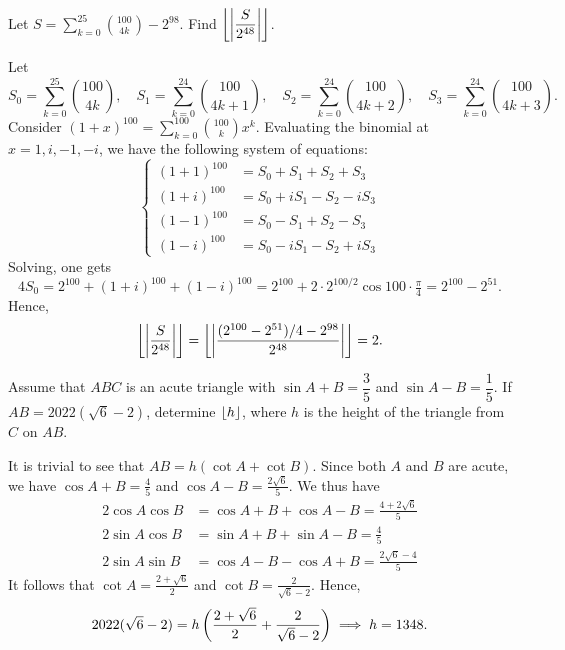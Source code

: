 \begin{question}[2]\label{A::2021-O-1-14}
    Let $S = \displaystyle\sum_{k=0}^{25} \binom{100}{4k} - 2^{98}$. Find $\left\lfloor \left\lvert \dfrac{S}{2^{48}} \right\rvert \right\rfloor$.
\end{question}
\begin{solution*}
    Let \[S_0 = \sum_{k=0}^{25} \binom{100}{4k}, \quad S_1 = \sum_{k=0}^{24} \binom{100}{4k+1}, \quad S_2 = \sum_{k=0}^{24} \binom{100}{4k+2}, \quad S_3 = \sum_{k=0}^{24} \binom{100}{4k+3}.\] Consider $(1 + x)^{100} = \displaystyle\sum_{k=0}^{100} \binom{100}{k} x^{k}$. Evaluating the binomial at $x = 1, i, -1, -i$, we have the following system of equations: \[\left\{
        \begin{aligned}
            (1+1)^{100} &= S_0 + S_1 + S_2 + S_3\\
            (1+i)^{100} &= S_0 + iS_1 - S_2 - iS_3\\
            (1-1)^{100} &= S_0 - S_1 + S_2 - S_3\\
            (1-i)^{100} &= S_0 - iS_1 - S_2 + iS_3
        \end{aligned}\right.\] Solving, one gets \[4S_0 = 2^{100} + (1+i)^{100} + (1-i)^{100} = 2^{100} + 2 \cdot 2^{100/2}\cos{100 \cdot \tfrac{\pi}4} = 2^{100} - 2^{51}.\] Hence, \[\left\lfloor \left\lvert \frac{S}{2^{48}} \right\rvert \right\rfloor = \left\lfloor \left\lvert \frac{(2^{100} - 2^{51})/4 - 2^{98}}{2^{48}} \right\rvert \right\rfloor = 2.\]
\end{solution*}

\begin{question}[1348]\label{A::2021-O-1-15}
    Assume that $ABC$ is an acute triangle with $\sin{A + B} = \dfrac35$ and $\sin{A-B} = \dfrac15$. If $AB = 2022(\sqrt6 - 2)$, determine $\left\lfloor h \right\rfloor$, where $h$ is the height of the triangle from $C$ on $AB$.
\end{question}
\begin{solution*}
    It is trivial to see that $AB = h(\cot A + \cot B)$. Since both $A$ and $B$ are acute, we have $\cos{A+B} = \frac45$ and $\cos{A-B} = \frac{2\sqrt{6}}{5}$. We thus have
    \begin{align*}
        2\cos A \cos B &= \cos{A + B} + \cos{A - B} = \frac{4 + 2\sqrt6}{5}\\
        2\sin A \cos B &= \sin{A + B} + \sin{A - B} = \frac45\\
        2\sin A \sin B &= \cos{A-B} - \cos{A+ B} = \frac{2\sqrt6 - 4}{5}
    \end{align*}
    It follows that $\cot A = \frac{2 + \sqrt6}{2}$ and $\cot B = \frac{2}{\sqrt6 - 2}$. Hence, \[2022(\sqrt 6 - 2) = h\left( \frac{2 + \sqrt6}{2} + \frac{2}{\sqrt6 - 2} \right) \implies h = 1348.\]
\end{solution*}

